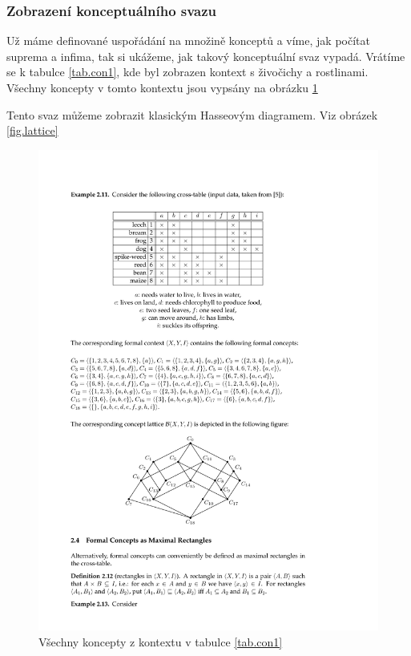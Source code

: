 \documentclass[12pt]{article}
\newcommand{\sssection}[1]{\subsubsection{#1}}
\begin{document}
\sssection{Zobrazení konceptuálního svazu}
Už máme definované uspořádání na množině konceptů a víme, jak počítat suprema a infima, tak si ukážeme, jak takový konceptuální svaz vypadá. Vrátíme se k tabulce \ref{tab.con1}, kde byl zobrazen kontext s živočichy a rostlinami. Všechny koncepty v tomto kontextu jsou vypsány na obrázku \ref{fig.concepts} 

Tento svaz můžeme zobrazit klasickým Hasseovým diagramem. Viz obrázek \ref{fig.lattice}

\begin{figure}
  \centering
  \includegraphics[width=14cm]{obrazky/koncepty.pdf}
  \caption{Všechny koncepty z kontextu v tabulce \ref{tab.con1}}
  \label{fig.concepts}
\end{figure}
\end{document}
